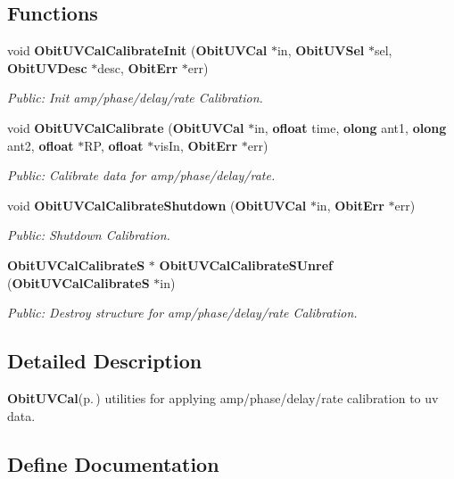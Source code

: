 \subsection*{Functions}
\begin{CompactItemize}
\item 
void {\bf Obit\-UVCal\-Calibrate\-Init} ({\bf Obit\-UVCal} $\ast$in, {\bf Obit\-UVSel} $\ast$sel, {\bf Obit\-UVDesc} $\ast$desc, {\bf Obit\-Err} $\ast$err)
\begin{CompactList}\small\item\em Public: Init amp/phase/delay/rate Calibration. \item\end{CompactList}\item 
void {\bf Obit\-UVCal\-Calibrate} ({\bf Obit\-UVCal} $\ast$in, {\bf ofloat} time, {\bf olong} ant1, {\bf olong} ant2, {\bf ofloat} $\ast$RP, {\bf ofloat} $\ast$vis\-In, {\bf Obit\-Err} $\ast$err)
\begin{CompactList}\small\item\em Public: Calibrate data for amp/phase/delay/rate. \item\end{CompactList}\item 
void {\bf Obit\-UVCal\-Calibrate\-Shutdown} ({\bf Obit\-UVCal} $\ast$in, {\bf Obit\-Err} $\ast$err)
\begin{CompactList}\small\item\em Public: Shutdown Calibration. \item\end{CompactList}\item 
{\bf Obit\-UVCal\-Calibrate\-S} $\ast$ {\bf Obit\-UVCal\-Calibrate\-SUnref} ({\bf Obit\-UVCal\-Calibrate\-S} $\ast$in)
\begin{CompactList}\small\item\em Public: Destroy structure for amp/phase/delay/rate Calibration. \item\end{CompactList}\end{CompactItemize}


\subsection{Detailed Description}
{\bf Obit\-UVCal}{\rm (p.\,\pageref{structObitUVCal})} utilities for applying amp/phase/delay/rate calibration to uv data. 



\subsection{Define Documentation}
